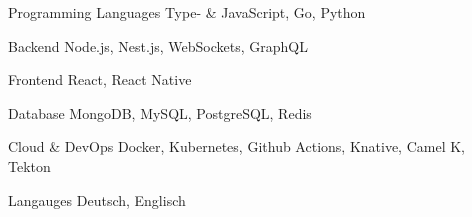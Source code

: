 

\begin{cvskills}

  \cvskill
    {Programming Languages} %
    {Type- \& JavaScript, Go, Python } %

  \cvskill
    {Backend} %
    {Node.js, Nest.js, WebSockets, GraphQL} %

  \cvskill
    {Frontend} %
    {React, React Native} %

  \cvskill
    {Database} %
    {MongoDB, MySQL, PostgreSQL, Redis} %

  \cvskill
    {Cloud \& DevOps} %
    {Docker, Kubernetes, Github Actions, Knative, Camel K, Tekton} %

  \cvskill
    {Langauges} %
    {Deutsch, Englisch} %

\end{cvskills}
